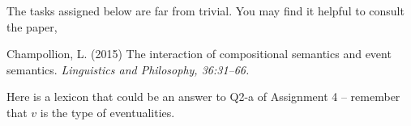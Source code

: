 \documentclass[10pt,a4paper]{exam}
\begin{document}


\vspace{10pt}

%

\vspace{90pt}


\noindent The tasks assigned below are far from trivial. You may find it helpful to consult the paper,


\vspace{10pt}

Champollion, L. (2015) The interaction of compositional semantics and event semantics. {\it Linguistics and Philosophy, 36:31--66.}


\vspace{20pt}


\noindent Here is a lexicon that could be an answer to Q2-a of Assignment 4 -- remember that $v$ is the type of eventualities.
\end{document}
